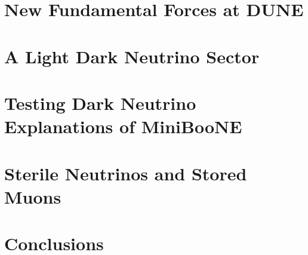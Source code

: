 \documentclass[openany,twoside,frontopenright,openright]{ip3thesis}
\begin{document}
\chapter{New Fundamental Forces at DUNE}


\chapter{A Light Dark Neutrino Sector}


\chapter{Testing Dark Neutrino Explanations of MiniBooNE }


\cleardoublepage

\chapter{Sterile Neutrinos and Stored Muons}


\chapter{Conclusions}

\end{document}
